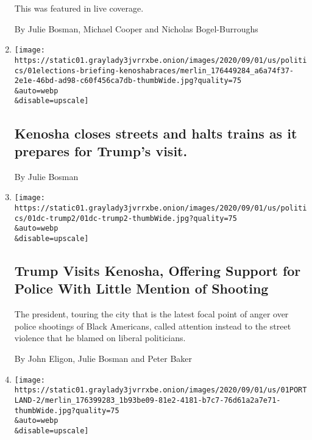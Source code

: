 \begin{enumerate}
  This was featured in live coverage.

  By Julie Bosman, Michael Cooper and Nicholas Bogel-Burroughs
\item
  \href{/2020/09/01/us/elections/kenosha-closes-streets-and-halts-trains-as-it-prepares-for-trumps-visit.html}{}

  \texttt{[image: https://static01.graylady3jvrrxbe.onion/images/2020/09/01/us/politics/01elections-briefing-kenoshabraces/merlin\_176449284\_a6a74f37-2e1e-46bd-ad98-c60f456ca7db-thumbWide.jpg?quality=75\\\&auto=webp\\\&disable=upscale]}

  \hypertarget{kenosha-closes-streets-and-halts-trains-as-it-prepares-for-trumps-visit}{%
  \subsection{Kenosha closes streets and halts trains as it prepares for
  Trump's
  visit.}\label{kenosha-closes-streets-and-halts-trains-as-it-prepares-for-trumps-visit}}

  By Julie Bosman
\item
  \href{/2020/09/01/us/politics/trump-conspiracy-theory-thugs-plane.html}{}

  \texttt{[image: https://static01.graylady3jvrrxbe.onion/images/2020/09/01/us/politics/01dc-trump2/01dc-trump2-thumbWide.jpg?quality=75\\\&auto=webp\\\&disable=upscale]}

  \hypertarget{trump-visits-kenosha-offering-support-for-police-with-little-mention-of-shooting}{%
  \subsection{Trump Visits Kenosha, Offering Support for Police With
  Little Mention of
  Shooting}\label{trump-visits-kenosha-offering-support-for-police-with-little-mention-of-shooting}}

  The president, touring the city that is the latest focal point of
  anger over police shootings of Black Americans, called attention
  instead to the street violence that he blamed on liberal politicians.

  By John Eligon, Julie Bosman and Peter Baker
\item
  \href{/2020/09/01/us/portland-kenosha-protests-clashes.html}{}

  \texttt{[image: https://static01.graylady3jvrrxbe.onion/images/2020/09/01/us/01PORTLAND-2/merlin\_176399283\_1b93be09-81e2-4181-b7c7-76d61a2a7e71-thumbWide.jpg?quality=75\\\&auto=webp\\\&disable=upscale]}


\end{enumerate}
